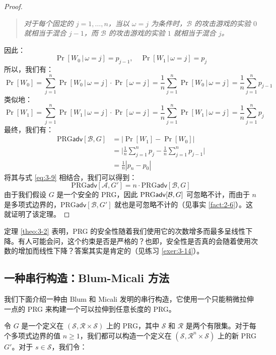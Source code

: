 \begin{proof}
\begin{quote}
\emph{对于每个固定的 $j=1,\dots,n$，当以 $\omega=j$ 为条件时，$\mathcal B$ 的攻击游戏的实验 $0$ 就相当于混合 $j-1$，而 $\mathcal B$ 的攻击游戏的实验 $1$ 就相当于混合 $j$。
}
\end{quote}
因此：
\[
\Pr[W_0\,|\,\omega=j]=p_{j-1},\quad
\Pr[W_1\,|\,\omega=j]=p_{j}
\]
所以，我们有：
\[
\Pr[W_0]
=\sum_{j=1}^n\Pr[W_0\,|\,\omega=j]\cdot\Pr[\omega=j]
=\frac{1}{n}\sum_{j=1}^n\Pr[W_0\,|\,\omega=j]
=\frac{1}{n}\sum_{j=1}^np_{j-1}
\]
类似地：
\[
\Pr[W_1]
=\sum_{j=1}^n\Pr[W_1\,|\,\omega=j]\cdot\Pr[\omega=j]
=\frac{1}{n}\sum_{j=1}^n\Pr[W_1\,|\,\omega=j]
=\frac{1}{n}\sum_{j=1}^np_{j}
\]
最终，我们有：
\[
\begin{aligned}
\mathrm{PRG}\mathsf{adv}[\mathcal{B},G]
&=|\Pr[W_1]-\Pr[W_0]|\\
&=\Bigg\lvert\frac{1}{n}\sum_{j=1}^np_j-\frac{1}{n}\sum_{j=1}^np_{j-1}\Bigg\rvert\\
&=\frac{1}{n}|p_n-p_0|
\end{aligned}
\]
将其与式 \ref{eq:3-9} 相结合，我们可以得到：
\[
\mathrm{PRG}\mathsf{adv}[\mathcal{A},G']
=n\cdot
\mathrm{PRG}\mathsf{adv}[\mathcal{B},G]
\]
由于我们假设 $G$ 是一个安全的 PRG，因此 ${\rm PRG\mathsf{adv}}[\mathcal{B},G]$ 可忽略不计，而由于 $n$ 是多项式边界的，$\mathrm{PRG}\mathsf{adv}[\mathcal{B},G']$ 就也是可忽略不计的（见事实 \ref{fact:2-6}）。这就证明了该定理。
\end{proof}

定理 \ref{theo:3-2} 表明，PRG 的安全性随着我们使用它的次数增多而最多呈线性下降。有人可能会问，这个约束是否是严格的？也即，安全性是否真的会随着使用次数的增加而线性下降？答案其实是肯定的（见练习 \ref{exer:3-14}）。

\subsection{一种串行构造：Blum-Micali 方法}\label{subsec:3-4-2}

我们下面介绍一种由 Blum 和 Micali 发明的串行构造，它使用一个只能稍微拉伸一点的 PRG 来构建一个可以拉伸到任意长度的 PRG。

令 $G$ 是一个定义在 $(\mathcal{S},\mathcal{R}\times\mathcal{S})$ 上的 PRG，其中 $\mathcal S$ 和 $\mathcal R$ 是两个有限集。对于每个多项式边界的值 $n\geq 1$，我们都可以构造一个定义在 $(\mathcal{S},\mathcal{R}^n\times\mathcal{S})$ 上的新 PRG $G'$。对于 $s\in\mathcal{S}$，我们令：

\vspace*{10pt}


